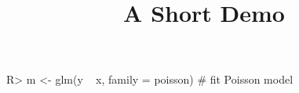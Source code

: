 \documentclass[article]{jss}
\title{A Short Demo}
\begin{document}
\begin{CodeInput}
R> m <- glm(y ~ x, family = poisson) # fit Poisson model
\end{CodeInput}
\end{document}
